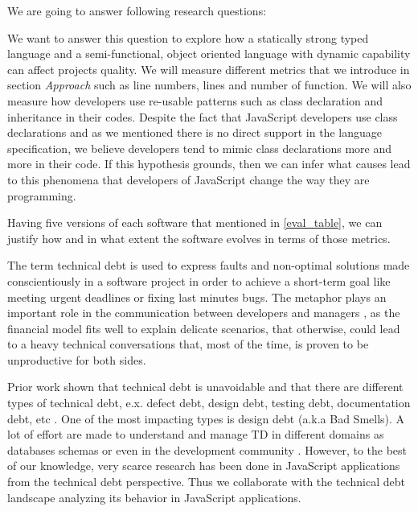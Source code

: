 
We are going to answer following research questions:


\noindent{\rqi}

We want to answer this question to explore how a statically strong typed language and a semi-functional, object oriented language with dynamic capability can affect projects quality. We will measure different metrics that we introduce in section \textit{Approach} such as line numbers, lines and number of function. We will also measure how developers use re-usable patterns such as class declaration and inheritance in their codes. Despite the fact that JavaScript developers use class declarations and as we mentioned there is no direct support in the language specification, we believe developers tend to mimic class declarations more and more in their code. If this hypothesis grounds, then we can infer what causes lead to this phenomena that developers of JavaScript change the way they are programming.
\par
{}
Having five versions of each software that mentioned in \ref{eval_table}, we can justify how and in what extent the software evolves in terms of those metrics. 


\noindent{\rqii}

		 
The term technical debt is used to express faults and non-optimal solutions made conscientiously in a software project in order to achieve a short-term goal like meeting urgent deadlines or fixing last minutes bugs. The metaphor plays an important role in the communication between developers and managers \cite{kruchten2013MTD}, as the financial model fits well to explain delicate scenarios, that otherwise, could lead to a heavy technical conversations that, most of the time, is proven to be unproductive for both sides.  
		 
Prior work shown that technical debt is unavoidable \cite{zazworka2013MTD} and that there are different types of technical debt, e.x. defect debt, design debt, testing debt, documentation debt, etc \cite{Seaman2011MMTD} . One of the most impacting types is design debt \cite{zazworka2011MTD}\cite{Fontana2012MTD} (a.k.a Bad Smells). A lot of effort are made to understand and manage TD in different domains as databases schemas \cite{Weber2014MTD} or even in the development community \cite{Tamburri2013CHASE}. However, to the best of our knowledge, very scarce research has been done in JavaScript applications from the technical debt perspective. Thus we collaborate with the technical debt landscape analyzing its behavior in JavaScript applications. 

